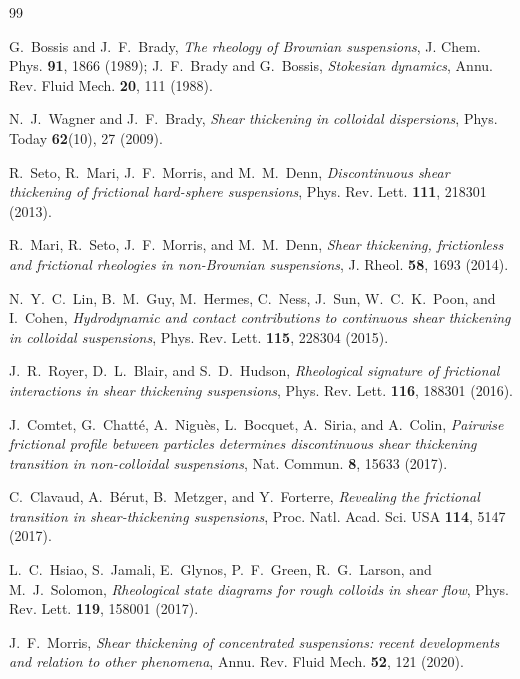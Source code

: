 \documentclass[11pt]{article}
\begin{document}
\begin{thebibliography}{99}
\small

 G.~Bossis and J.~F.~Brady, \emph{The rheology of Brownian suspensions}, J. Chem. Phys. \textbf{91}, 1866 (1989); J.~F.~Brady and G.~Bossis, \emph{Stokesian dynamics}, Annu. Rev. Fluid Mech. \textbf{20}, 111 (1988).

 N.~J.~Wagner and J.~F.~Brady, \emph{Shear thickening in colloidal dispersions}, Phys. Today \textbf{62}(10), 27 (2009).

 R.~Seto, R.~Mari, J.~F.~Morris, and M.~M.~Denn, \emph{Discontinuous shear thickening of frictional hard-sphere suspensions}, Phys. Rev. Lett. \textbf{111}, 218301 (2013).

 R.~Mari, R.~Seto, J.~F.~Morris, and M.~M.~Denn, \emph{Shear thickening, frictionless and frictional rheologies in non-Brownian suspensions}, J. Rheol. \textbf{58}, 1693 (2014).

 N.~Y.~C.~Lin, B.~M.~Guy, M.~Hermes, C.~Ness, J.~Sun, W.~C.~K.~Poon, and I.~Cohen, \emph{Hydrodynamic and contact contributions to continuous shear thickening in colloidal suspensions}, Phys. Rev. Lett. \textbf{115}, 228304 (2015).

 J.~R.~Royer, D.~L.~Blair, and S.~D.~Hudson, \emph{Rheological signature of frictional interactions in shear thickening suspensions}, Phys. Rev. Lett. \textbf{116}, 188301 (2016).

 J.~Comtet, G.~Chatt\'e, A.~Ni\-guès, L.~Bocquet, A.~Siria, and A.~Colin, \emph{Pairwise frictional profile between particles determines discontinuous shear thickening transition in non-colloidal suspensions}, Nat. Commun. \textbf{8}, 15633 (2017).

 C.~Clavaud, A.~B\'erut, B.~Metzger, and Y.~Forterre, \emph{Revealing the frictional transition in shear-thickening suspensions}, Proc. Natl. Acad. Sci. USA \textbf{114}, 5147 (2017).

 L.~C.~Hsiao, S.~Jamali, E.~Glynos, P.~F.~Green, R.~G.~Larson, and M.~J.~Solomon, \emph{Rheological state diagrams for rough colloids in shear flow}, Phys. Rev. Lett. \textbf{119}, 158001 (2017).

 J.~F.~Morris, \emph{Shear thickening of concentrated suspensions: recent developments and relation to other phenomena}, Annu. Rev. Fluid Mech. \textbf{52}, 121 (2020).


\end{thebibliography}
\end{document}
